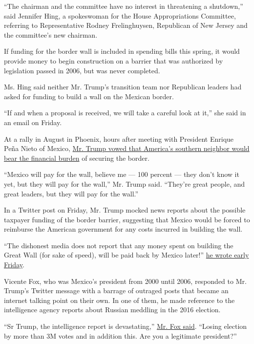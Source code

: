 ``The chairman and the committee have no interest in threatening a
shutdown,'' said Jennifer Hing, a spokeswoman for the House
Appropriations Committee, referring to Representative Rodney
Frelinghuysen, Republican of New Jersey and the committee's new
chairman.

If funding for the border wall is included in spending bills this
spring, it would provide money to begin construction on a barrier that
was authorized by legislation passed in 2006, but was never completed.

Ms. Hing said neither Mr. Trump's transition team nor Republican leaders
had asked for funding to build a wall on the Mexican border.

``If and when a proposal is received, we will take a careful look at
it,'' she said in an email on Friday.

At a rally in August in Phoenix, hours after meeting with President
Enrique Peña Nieto of Mexico,
\href{https://www.nytimes.com/2016/09/01/us/politics/donald-trump-immigration-speech.html}{Mr.
Trump vowed that America's southern neighbor would bear the financial
burden} of securing the border.

``Mexico will pay for the wall, believe me --- 100 percent --- they
don't know it yet, but they will pay for the wall,'' Mr. Trump said.
``They're great people, and great leaders, but they will pay for the
wall.''

In a Twitter post on Friday, Mr. Trump mocked news reports about the
possible taxpayer funding of the border barrier, suggesting that Mexico
would be forced to reimburse the American government for any costs
incurred in building the wall.

``The dishonest media does not report that any money spent on building
the Great Wall (for sake of speed), will be paid back by Mexico later!''
\href{https://twitter.com/realDonaldTrump/status/817329823374831617}{he
wrote early Friday}.

Vicente Fox, who was Mexico's president from 2000 until 2006, responded
to Mr. Trump's Twitter message with a barrage of outraged posts that
became an internet talking point on their own. In one of them, he made
reference to the intelligence agency reports about Russian meddling in
the 2016 election.

``Sr Trump, the intelligence report is devastating,''
\href{https://twitter.com/VicenteFoxQue/status/817502062170738689}{Mr.
Fox said}. ``Losing election by more than 3M votes and in addition this.
Are you a legitimate president?''

